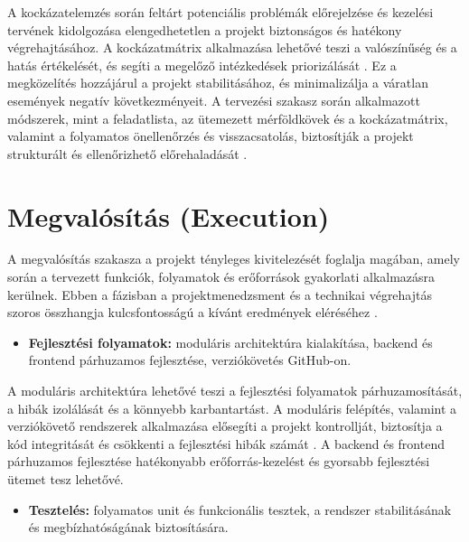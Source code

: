 A kockázatelemzés során feltárt potenciális problémák előrejelzése és kezelési tervének kidolgozása elengedhetetlen a projekt biztonságos és hatékony végrehajtásához. 
A kockázatmátrix alkalmazása lehetővé teszi a valószínűség és a hatás értékelését, és segíti a megelőző intézkedések priorizálását \cite{Kovacs2016,Kaposi2019}. 
Ez a megközelítés hozzájárul a projekt stabilitásához, és minimalizálja a váratlan események negatív következményeit.
A tervezési szakasz során alkalmazott módszerek, mint a feladatlista, az ütemezett mérföldkövek és a kockázatmátrix, 
valamint a folyamatos önellenőrzés és visszacsatolás, biztosítják a projekt strukturált és ellenőrizhető előrehaladását \cite{Hajdu2014,Szalay2018}.


\section{Megvalósítás (Execution)}

A megvalósítás szakasza a projekt tényleges kivitelezését foglalja magában, amely során a tervezett funkciók, 
folyamatok és erőforrások gyakorlati alkalmazásra kerülnek. Ebben a fázisban a projektmenedzsment 
és a technikai végrehajtás szoros összhangja kulcsfontosságú a kívánt eredmények eléréséhez \cite{Hajdu2014,Szalay2018,Kaposi2019}.

\begin{itemize}
    \item \textbf{Fejlesztési folyamatok:} moduláris architektúra kialakítása, backend és frontend párhuzamos fejlesztése, verziókövetés GitHub-on.
\end{itemize}

A moduláris architektúra lehetővé teszi a fejlesztési folyamatok párhuzamosítását, a hibák izolálását és a könnyebb karbantartást. 
A moduláris felépítés, valamint a verziókövető rendszerek alkalmazása elősegíti 
a projekt kontrollját, biztosítja a kód integritását és csökkenti a fejlesztési hibák számát \cite{Kovacs2016,Kaposi2019}. 
A backend és frontend párhuzamos fejlesztése hatékonyabb erőforrás-kezelést és gyorsabb fejlesztési ütemet tesz lehetővé.

\begin{itemize}
    \item \textbf{Tesztelés:} folyamatos unit és funkcionális tesztek, a rendszer stabilitásának és megbízhatóságának biztosítására.
\end{itemize}

